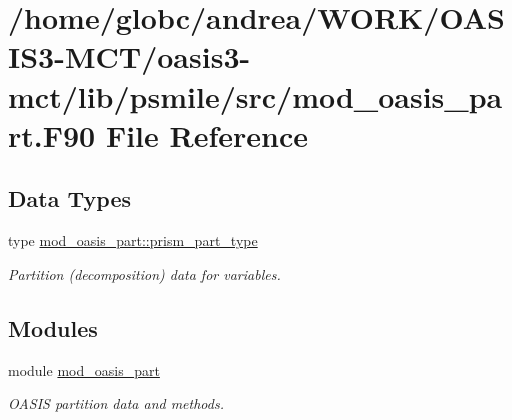 \hypertarget{mod__oasis__part_8_f90}{}\section{/home/globc/andrea/\+W\+O\+R\+K/\+O\+A\+S\+I\+S3-\/\+M\+C\+T/oasis3-\/mct/lib/psmile/src/mod\+\_\+oasis\+\_\+part.F90 File Reference}
\label{mod__oasis__part_8_f90}
\subsection*{Data Types}
\begin{DoxyCompactItemize}
\item 
type \hyperlink{structmod__oasis__part_1_1prism__part__type}{mod\+\_\+oasis\+\_\+part\+::prism\+\_\+part\+\_\+type}
\begin{DoxyCompactList}\small\item\em Partition (decomposition) data for variables. \end{DoxyCompactList}\end{DoxyCompactItemize}
\subsection*{Modules}
\begin{DoxyCompactItemize}
\item 
module \hyperlink{namespacemod__oasis__part}{mod\+\_\+oasis\+\_\+part}
\begin{DoxyCompactList}\small\item\em O\+A\+S\+IS partition data and methods. \end{DoxyCompactList}\end{DoxyCompactItemize}

